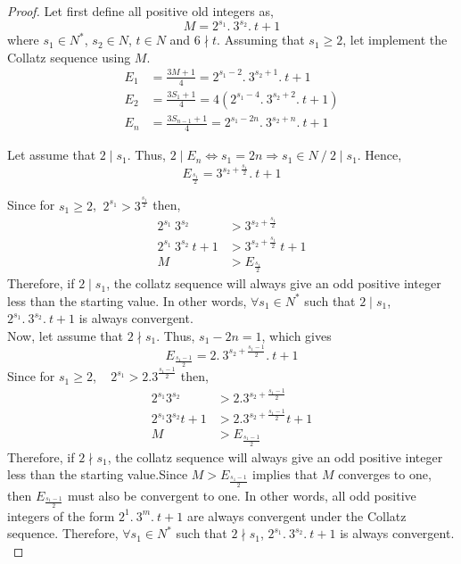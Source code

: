 \documentclass[14pt,a4paper]{article}
\theoremstyle{plain}
\begin{document}
\begin{proof}
    Let first define all positive old integers as, 
    \begin{equation}
        M = 2^{s_{1}}.~3^{s_{2}}.~t +1 
    \end{equation}
    where $s_{1} \in N^{*}$, $s_{2} \in N$, $t \in N $ and $6\nmid t$. Assuming that $s_{1} \geq 2$, let implement the Collatz sequence using $M$.
    \begin{align}
        E_{1} &= \frac{3M+1}{4}= 2^{s_{1}-2}.~3^{s_{2}+1}.~t + 1
        \\
        E_{2} &= \frac{3S_{1}+1}{4} = 4(2^{s_{1}-4}.~3^{s_{2}+2}.~t + 1) 
        \\
        E_{n} &= \frac{3S_{n-1}+1}{4} = 2^{s_{1}-2n}.~3^{s_{2}+n}.~t + 1
    \end{align}
    
    Let assume that $2 \mid s_{1}$. Thus, $ 2 \mid E_{n} \Leftrightarrow  s_{1} = 2n \Rightarrow s_{1} \in N ~/~ 2\mid s_{1} $. Hence, 
    \begin{equation}
        E_{\frac{s_{1}}{2}} = 3^{s_{2}+\frac{s_{1}}{2}}.~t + 1 
    \end{equation}
    
     Since for $s_{1}\geq 2$, $~2^{s_{1}} > 3^{\frac{s_{1}}{2}}$ then, 
    \begin{align}
        2^{s_{1}}~3^{s_{2}} &> 3^{s_{2}+\frac{s_{1}}{2}} \\
        2^{s_{1}}~3^{s_{2}}~t+1 &> 3^{s_{2}+\frac{s_{1}}{2}}~t+1 \\
        M &> E_{\frac{s_{1}}{2}}
    \end{align}
    Therefore, if $2\mid s_{1}$, the collatz sequence will always give an odd positive integer less than the starting value. In other words, $\forall s_{1} \in N^{*}$ such that $2\mid s_{1}$, $2^{s_{1}}.~3^{s_{2}}.~t+1$ is always convergent.\\ 
    
    Now, let assume that $2\nmid s_{1}$. Thus, $s_{1}-2n=1$, which gives
    \begin{equation}
        E_{\frac{s_{1}-1}{2}} = 2.~3^{s_{2}+\frac{s_{1}-1}{2}}.~t+1
    \end{equation}
    Since for $s_{1}\geq 2$, ~ $2^{s_{1}}> 2.3^{\frac{s_{1}-1}{2}}$ then,
    \begin{align}
        2^{s_{1}}3^{s_{2}} &> 2.3^{s_{2}+\frac{s_{1}-1}{2}} \\
        2^{s_{1}}3^{s_{2}}t+1 &> 2.3^{s_{2}+\frac{s_{1}-1}{2}}t+1\\
        M &> E_{\frac{s_{1}-1}{2}}
    \end{align}
    Therefore, if $2\nmid s_{1}$, the collatz sequence will always give an odd positive integer less than the starting value.Since $ M > E_{\frac{s_{1}-1}{2}}$ implies that $M$ converges to one, then $E_{\frac{s_{1}-1}{2}}$  must also be convergent to one. In other words, all odd positive integers of the form $2^{1}.~3^{m}.~t+1$ are always convergent under the Collatz sequence. Therefore, $\forall s_{1} \in N^{*}$ such that $2\nmid s_{1}$, $2^{s_{1}}.~3^{s_{2}}.~t+1$ is always convergent.\\
\end{proof}
\end{document}
